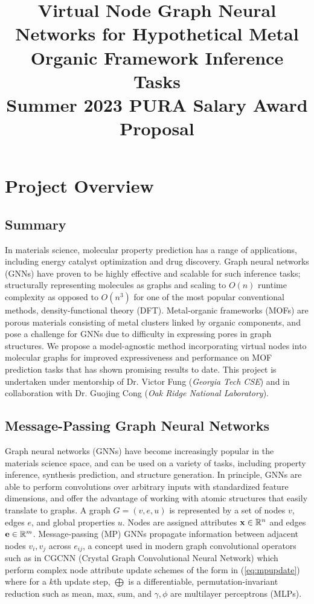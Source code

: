 \documentclass{lxaiproposal}
\title{Virtual Node Graph Neural Networks for Hypothetical Metal Organic Framework Inference Tasks\\ \large Summer 2023 PURA Salary Award Proposal}
\author{\coord{Sidharth Baskaran}{}{1}}
\begin{document}
\maketitle

\section*{Project Overview}

\subsection*{Summary}

In materials science, molecular property prediction has a range of applications, including
energy catalyst optimization and drug discovery. Graph neural networks (GNNs) have proven to be highly effective and scalable for such inference tasks; structurally representing molecules as graphs and scaling to $O(n)$ runtime complexity as opposed to $O(n^3)$ for one of the most popular conventional methods, density-functional theory (DFT). Metal-organic frameworks (MOFs) are porous materials consisting of metal clusters linked by organic components, and pose a challenge for GNNs due to difficulty in expressing pores in graph structures. We propose a model-agnostic method incorporating virtual nodes into molecular graphs for improved expressiveness and performance on MOF prediction tasks that has shown promising results to date. This project is undertaken under mentorship of Dr. Victor Fung (\textit{Georgia Tech CSE}) and in collaboration with Dr. Guojing Cong (\textit{Oak Ridge National Laboratory}).

\subsection*{Message-Passing Graph Neural Networks}

Graph neural networks (GNNs) have become increasingly popular in the materials science space, and can be used on a variety of tasks, including property inference, synthesis prediction, and structure generation\cite{Reiser2022}. In principle, GNNs are able to perform convolutions over arbitrary inputs with standardized feature dimensions, and offer the advantage of working with atomic structures that easily translate to graphs. A graph $G=(v,e,u)$ is represented by a set of nodes $v$, edges $e$, and global properties $u$. Nodes are assigned attributes ${\bf x}\in \mathbb{R}^{n}$ and edges ${\bf e}\in \mathbb{R}^m$. Message-passing (MP) GNNs propagate information between adjacent nodes $v_i,v_j$ across $e_{ij}$, a concept used in modern graph convolutional operators such as in CGCNN (Crystal Graph Convolutional Neural Network)\cite{Xie_2018} which perform complex node attribute update schemes of the form in (\ref{eq:mpupdate}) where for a $k$th update step, $\bigoplus$ is a differentiable, permutation-invariant reduction such as mean, max, sum, and $\gamma,\phi$ are multilayer perceptrons (MLPs).
\end{document}
